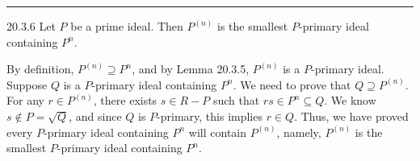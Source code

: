 \documentclass[letterpaper, 12pt]{article}
\begin{document}
\noindent\rule{7in}{2.8pt}
\begin{problem}{20.3.6}
Let \(P\) be a prime ideal. Then \(P^{(n)}\) is the smallest \(P\)-primary ideal containing \(P^n\).
\end{problem}
\begin{solution}
By definition, \(P^{(n)}\supseteq P^n\), and by Lemma 20.3.5, \(P^{(n)}\) is a \(P\)-primary ideal. Suppose \(Q\) is a \(P\)-primary ideal containing \(P^n\). We need to prove that \(Q\supseteq P^{(n)}\). For any \(r\in P^{(n)}\), there exists \(s\in R-P\) such that \(rs\in P^n\subseteq Q\). We know \(s\notin P=\sqrt{Q}\), and since \(Q\) is \(P\)-primary, this implies \(r\in Q\). Thus, we have proved every \(P\)-primary ideal containing \(P^n\) will contain \(P^{(n)}\), namely, \(P^{(n)}\) is the smallest \(P\)-primary ideal containing \(P^n\).
\end{solution}
\end{document}
